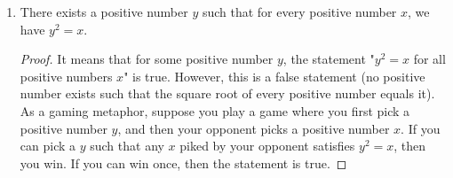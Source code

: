 \documentclass[../main.tex]{subfiles}
\begin{document}
\begin{enumerate}[ref={\thesection.\arabic*}]
\begin{enumerate}
        \begin{proof}
            It means that for all positive numbers $y$, the statement "$y^2=x$ for some positive number $x$" is true. This statement is true. As a gaming metaphor, suppose you play a game where your opponent first picks a positive number $y$, and then you pick a positive number $x$. If $y^2=x$, then you win. If you can always win, then the statement is true.
        \end{proof}
        \item There exists a positive number $y$ such that for every positive number $x$, we have $y^2=x$.
        \begin{proof}
            It means that for some positive number $y$, the statement "$y^2=x$ for all positive numbers $x$" is true. However, this is a false statement (no positive number exists such that the square root of every positive number equals it). As a gaming metaphor, suppose you play a game where you first pick a positive number $y$, and then your opponent picks a positive number $x$. If you can pick a $y$ such that any $x$ piked by your opponent satisfies $y^2=x$, then you win. If you can win once, then the statement is true.
        \end{proof}
    \end{enumerate}
\end{enumerate}
\end{document}
